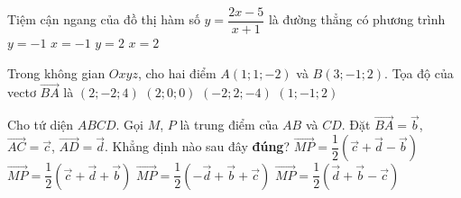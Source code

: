 \begin{ex}%
	Tiệm cận ngang của đồ thị hàm số $y=\dfrac{2x-5}{x+1}$ là đường thẳng có phương trình
	\choice
	{$y=-1$}
	{$x=-1$}
	{\True $y=2$}
	{$x=2$}
\end{ex}

\begin{ex}%
	Trong không gian $Oxyz$, cho hai điểm $A(1;1;-2)$ và $B(3;-1;2)$. Tọa độ của vectơ $\vec{BA}$ là
	\choice
	{$(2;-2;4)$}
	{$(2;0;0)$}
	{\True $(-2;2;-4)$}
	{$(1;-1;2)$}
\end{ex}

\begin{ex}%
	Cho tứ diện $ABCD$. Gọi $M$, $P$ là trung điểm của $AB$ và $CD$. Đặt $\vec{BA}=\vec{b}$, $\vec{AC}=\vec{c}$, $\vec{AD}=\vec{d}$. Khẳng định nào sau đây \textbf{đúng}?
	\choice
	{\True $\vec{MP}=\dfrac{1}{2}(\vec{c}+\vec{d}-\vec{b})$}
	{$\vec{MP}=\dfrac{1}{2}(\vec{c}+\vec{d}+\vec{b})$}
	{$\vec{MP}=\dfrac{1}{2}(-\vec{d}+\vec{b}+\vec{c})$}
	{$\vec{MP}=\dfrac{1}{2}(\vec{d}+\vec{b}-\vec{c})$}
\end{ex}
\cauds

